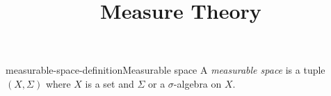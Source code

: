 \documentclass[preview]{standalone}
\begin{document}
\title{Measure Theory}
\genpage


\begin{snippetdefinition}{measurable-space-definition}{Measurable space}
    A \textit{measurable space} is a tuple \((X, \Sigma)\)
    where \(X\) is a set and \(\Sigma\) or a \(\sigma\)-algebra on \(X\).
\end{snippetdefinition}
\end{document}
